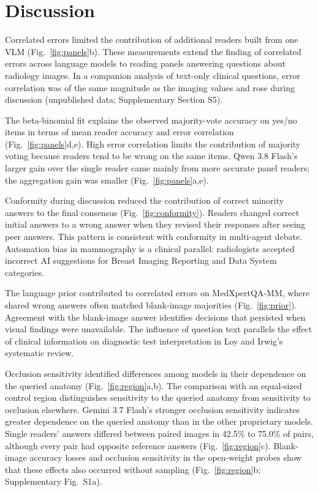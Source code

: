 \section{Discussion}

Correlated errors limited the contribution of additional readers built from one VLM (Fig.~\ref{fig:panels}b). These measurements extend the finding of correlated errors across language models to reading panels answering questions about radiology images.\cite{correlated2025} In a companion analysis of text-only clinical questions, error correlation was of the same magnitude as the imaging values and rose during discussion (unpublished data; Supplementary Section S5).

The beta-binomial fit explains the observed majority-vote accuracy on yes/no items in terms of mean reader accuracy and error correlation (Fig.~\ref{fig:panels}d,e). High error correlation limits the contribution of majority voting because readers tend to be wrong on the same items. Qwen 3.8 Flash's larger gain over the single reader came mainly from more accurate panel readers; the aggregation gain was smaller (Fig.~\ref{fig:panels}a,e).

Conformity during discussion reduced the contribution of correct minority answers to the final consensus (Fig.~\ref{fig:conformity}). Readers changed correct initial answers to a wrong answer when they revised their responses after seeing peer answers. This pattern is consistent with conformity in multi-agent debate.\cite{demystifying_mad} Automation bias in mammography is a clinical parallel: radiologists accepted incorrect AI suggestions for Breast Imaging Reporting and Data System categories.\cite{dratsch2023automation}

The language prior contributed to correlated errors on MedXpertQA-MM, where shared wrong answers often matched blank-image majorities (Fig.~\ref{fig:prior}). Agreement with the blank-image answer identifies decisions that persisted when visual findings were unavailable. The influence of question text parallels the effect of clinical information on diagnostic test interpretation in Loy and Irwig's systematic review.\cite{loy2004clinical}

Occlusion sensitivity identified differences among models in their dependence on the queried anatomy (Fig.~\ref{fig:region}a,b). The comparison with an equal-sized control region distinguishes sensitivity to the queried anatomy from sensitivity to occlusion elsewhere.\cite{zeiler2014visualizing} Gemini 3.7 Flash's stronger occlusion sensitivity indicates greater dependence on the queried anatomy than in the other proprietary models. Single readers' answers differed between paired images in 42.5\% to 75.0\% of pairs, although every pair had opposite reference answers (Fig.~\ref{fig:region}c). Blank-image accuracy losses and occlusion sensitivity in the open-weight probes show that these effects also occurred without sampling (Fig.~\ref{fig:region}b; Supplementary Fig.~S1a).

